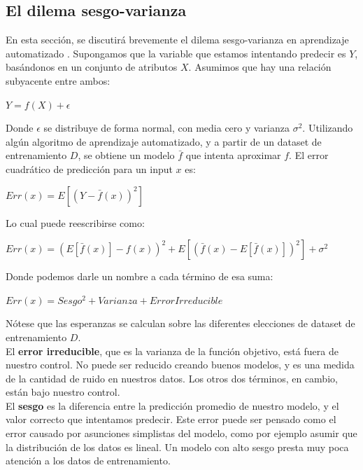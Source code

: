 \subsection{El dilema sesgo-varianza}

En esta sección, se discutirá brevemente el dilema sesgo-varianza en aprendizaje automatizado \cite{statisticallearning}. Supongamos que la variable que estamos intentando predecir es $Y$, basándonos en un conjunto de atributos $X$. Asumimos que hay una relación subyacente entre ambos:
\begin{center}
$Y = f(X) + \epsilon$
\end{center}

Donde $\epsilon$ se distribuye de forma normal, con media cero y varianza $\sigma^2$. Utilizando algún algoritmo de aprendizaje automatizado, y a partir de un dataset de entrenamiento $D$, se obtiene un modelo $\bar{f}$ que intenta aproximar $f$. El error cuadrático de predicción para un input $x$ es:\\

\begin{center}
$Err(x) = E[(Y-\bar{f}(x))^2]$
\end{center}

Lo cual puede reescribirse como:

\begin{center}
$Err(x) = (E[\bar{f}(x)]-f(x))^2 + E[(\bar{f}(x)-E[\bar{f}(x)])^2] + \sigma^2$ 
\end{center}

Donde podemos darle un nombre a cada término de esa suma:

\begin{center}
$Err(x) =  Sesgo^2 + Varianza + Error Irreducible$
\end{center}

Nótese que las esperanzas se calculan sobre las diferentes elecciones de dataset de entrenamiento $D$. \\

El \textbf{error irreducible}, que es la varianza de la función objetivo, está fuera de nuestro control. No puede ser reducido creando buenos modelos, y es una medida de la cantidad de ruido en nuestros datos. Los otros dos términos, en cambio, están bajo nuestro control.\\

El \textbf{sesgo} es la diferencia entre la predicción promedio de nuestro modelo, y el valor correcto que intentamos predecir. Este error puede ser pensado como el error causado por asunciones simplistas del modelo, como por ejemplo asumir que la distribución de los datos es lineal. Un modelo con alto sesgo presta muy poca atención a los datos de entrenamiento. \\

